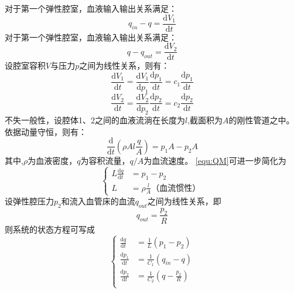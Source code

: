 对于第一个弹性腔室，血液输入输出关系满足：
\begin{equation}
    \label{equ:QS1}
    q_{in}-q=\frac{\mathrm{d} V_{1}}{\mathrm{d} t}
\end{equation}
对于第一个弹性腔室，血液输入输出关系满足：
\begin{equation}
    \label{equ:QS2}
    q-q_{out}=\frac{\mathrm{d} V_{2}}{\mathrm{d} t}
\end{equation}
设腔室容积$V$与压力$p$之间为线性关系，则有：
\begin{equation}
    \label{equ:QSV1}
    \frac{\mathrm{d} V_{1}}{\mathrm{d} t}
    =\frac{\mathrm{d} V_{1}}{\mathrm{d} p_{1}}\frac{\mathrm{d} p_{1}}{\mathrm{d} t}
    =c_{1}\frac{\mathrm{d} p_{1}}{\mathrm{d} t}
\end{equation}
\begin{equation}
    \label{equ:QSV2}
    \frac{\mathrm{d} V_{2}}{\mathrm{d} t}
    =\frac{\mathrm{d} V_{2}}{\mathrm{d} p_{2}}\frac{\mathrm{d} p_{2}}{\mathrm{d} t}
    =c_{2}\frac{\mathrm{d} p_{2}}{\mathrm{d} t}
\end{equation}
不失一般性，设腔体1、2之间的血液流淌在长度为$l$,截面积为$A$的刚性管道之中。依据动量守恒，则有：
\begin{equation}
    \label{equ:QM}
    \frac{\mathrm{d}}{\mathrm{d} t}\left ( \rho Al\frac{q}{A} \right )=p_{1}A-p_{2}A
\end{equation}
其中,$\rho$为血液密度，$q$为容积流量，$q/A$为血流速度。
\autoref{equ:QM}可进一步简化为
\begin{equation}
    \left \{
    \begin{aligned}
        L\frac{\mathrm{d} q}{\mathrm{d} t} &= p_{1}-p_{2} \\
        L &=\rho \frac{l}{A} \text{（血流惯性）}
    \end{aligned}
    \right.
\end{equation}
设弹性腔压力$p_{2}$和流入血管床的血流$q_{out}$之间为线性关系，即
\begin{equation}
    \label{equ:pq}
    q_{out}=\frac{p_{2}}{R}
\end{equation}
则系统的状态方程可写成
\begin{equation}
    \left \{
    \begin{aligned}
        \frac{\mathrm{d} q}{\mathrm{d} t} &= \frac{1}{L}(p_{1}-p_{2}) \\
        \frac{\mathrm{d} p_{1}}{\mathrm{d} t} &= \frac{1}{C_{1}}(q_{in}-q) \\
        \frac{\mathrm{d} p_{2}}{\mathrm{d} t} &= \frac{1}{C_{2}}(q-\frac{p_{2}}{R}) \\
    \end{aligned}
    \right.
\end{equation}
